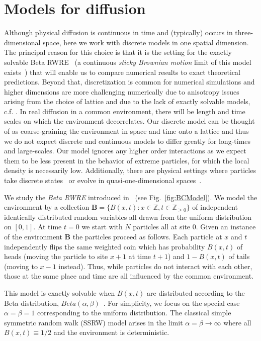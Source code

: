 \section{Models for diffusion}
Although physical diffusion is continuous in time and (typically) occurs in three-dimensional space, here we work with discrete models in one spatial dimension. The principal reason for this choice is that it is the setting for the exactly solvable  Beta RWRE~\cite{barraquand_random-walk_2017} (a continuous {\it sticky Brownian motion} limit of this model exists~\cite{barraquand_large_2020}) that will enable us to compare numerical results to exact theoretical predictions.
Beyond that, discretization is common for numerical simulations and higher dimensions are more challenging numerically due to anisotropy issues arising from the choice of lattice and due to the lack of exactly solvable models, c.f. \cite{le_doussal_diffusion_2017}. In real diffusion in a common environment, there will be length and time scales on which the environment decorrelates.  Our discrete model can be thought of as coarse-graining the environment in space and time onto a lattice and thus we do not expect discrete and continuous models to differ greatly for long-times and large-scales. Our model ignores any higher order interactions as we expect them to be less present in the behavior of extreme particles, for which the local density is necessarily low. Additionally, there are physical settings where particles take discrete states~\cite{feller_diffusion_1951, moran_random_1958} or evolve in quasi-one-dimensional spaces~\cite{pollard_gaseous_1948,ahmadi_diffusion_2017}.

We study the {\it Beta RWRE} introduced in~\cite{barraquand_random-walk_2017} (see Fig.~\ref{fig:BCModel}). We model the environment by a collection $\mathbf{B}= \big\{B(x,t):x\in \mathbb{Z},t\in \mathbb{Z}_{\geq 0}\big\}$ of independent identically distributed random variables all drawn from the uniform distribution on $[0,1]$. At time $t=0$ we start with $N$ particles all at site $0$. Given an instance of the environment $\mathbf{B}$ the particles proceed as follows. Each particle at $x$ and $t$ independently flips the same weighted coin which has probability $B(x,t)$ of heads (moving the particle to site $x+1$ at time $t+1$) and $1-B(x,t)$ of tails (moving to $x-1$ instead). Thus, while particles do not interact with each other, those at the same place and time are all influenced by the common environment.

This model is exactly solvable when $B(x,t)$ are distributed according to the Beta distribution, $Beta(\alpha, \beta)$~\cite{barraquand_random-walk_2017}. For simplicity, we focus on the special case $\alpha=\beta=1$ corresponding to the uniform distribution. The classical simple symmetric random walk (SSRW) model arises in the limit $\alpha=\beta\to \infty$ where all $B(x,t)\equiv 1/2$ and the environment is deterministic.

